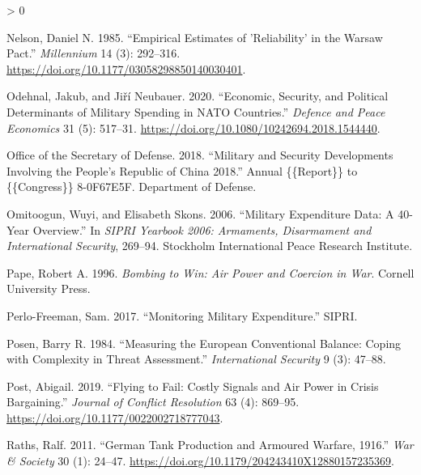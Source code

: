 \documentclass[
]{article}
\newlength{\cslhangindent}
\newenvironment{CSLReferences}[2] %
 {%
  \setlength{\parindent}{0pt}
  \ifodd #1 \everypar{\setlength{\hangindent}{\cslhangindent}}\ignorespaces\fi
  \ifnum #2 > 0
  \setlength{\parskip}{#2\baselineskip}
  \fi
 }%
 {}
\begin{document}
\begin{CSLReferences}{1}{0}
\leavevmode\hypertarget{ref-nelson_empiricalestimatesreliability_1985}{}%
Nelson, Daniel N. 1985. {``Empirical {Estimates} of '{Reliability}' in the {Warsaw Pact}.''} \emph{Millennium} 14 (3): 292--316. \url{https://doi.org/10.1177/03058298850140030401}.

\leavevmode\hypertarget{ref-odehnal_economicsecuritypolitical_2020}{}%
Odehnal, Jakub, and Jiří Neubauer. 2020. {``Economic, {Security}, and {Political Determinants} of {Military Spending} in {NATO Countries}.''} \emph{Defence and Peace Economics} 31 (5): 517--31. \url{https://doi.org/10.1080/10242694.2018.1544440}.

\leavevmode\hypertarget{ref-officeofthesecretaryofdefense_militarysecuritydevelopments_2018}{}%
Office of the Secretary of Defense. 2018. {``Military and {Security Developments Involving} the {People}'s {Republic} of {China} 2018.''} Annual \{\{Report\}\} to \{\{Congress\}\} 8-0F67E5F. {Department of Defense}.

\leavevmode\hypertarget{ref-omitoogun_militaryexpendituredata_2006}{}%
Omitoogun, Wuyi, and Elisabeth Skons. 2006. {``Military Expenditure Data: A 40-Year Overview.''} In \emph{{SIPRI Yearbook} 2006: {Armaments}, {Disarmament} and {International Security}}, 269--94. {Stockholm International Peace Research Institute}.

\leavevmode\hypertarget{ref-pape_bombingwinair_1996}{}%
Pape, Robert A. 1996. \emph{Bombing to {Win}: {Air Power} and {Coercion} in {War}}. {Cornell University Press}.

\leavevmode\hypertarget{ref-perlo-freeman_monitoringmilitaryexpenditure_2017}{}%
Perlo-Freeman, Sam. 2017. {``Monitoring Military Expenditure.''} {SIPRI}.

\leavevmode\hypertarget{ref-posen_measuringeuropeanconventional_1984}{}%
Posen, Barry R. 1984. {``Measuring the {European Conventional Balance}: {Coping} with {Complexity} in {Threat Assessment}.''} \emph{International Security} 9 (3): 47--88.

\leavevmode\hypertarget{ref-post_flyingfailcostly_2019}{}%
Post, Abigail. 2019. {``Flying to {Fail}: {Costly Signals} and {Air Power} in {Crisis Bargaining}.''} \emph{Journal of Conflict Resolution} 63 (4): 869--95. \url{https://doi.org/10.1177/0022002718777043}.

\leavevmode\hypertarget{ref-raths_germantankproduction_2011}{}%
Raths, Ralf. 2011. {``German {Tank Production} and {Armoured Warfare}, 1916{}.''} \emph{War \& Society} 30 (1): 24--47. \url{https://doi.org/10.1179/204243410X12880157235369}.


\end{CSLReferences}
\end{document}
